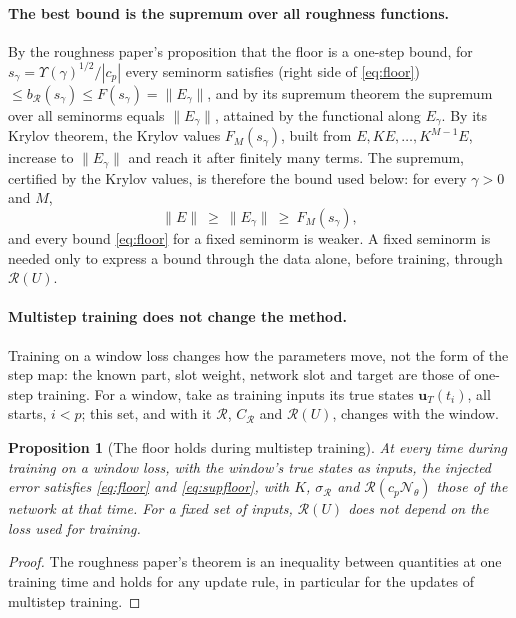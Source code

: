 \documentclass[11pt]{article}
\newtheorem{proposition}{Proposition}
\theoremstyle{definition}
\theoremstyle{remark}
\newcommand{\uu}{\mathbf{u}}
\newcommand{\Rgh}{\mathcal{R}}
\newcommand{\Nn}{\mathcal N_\theta}
\begin{document}
\paragraph{The best bound is the supremum over all roughness functions.}
By the roughness paper's proposition that the floor is a one-step bound, for $s_\gamma=\Upsilon(\gamma)^{1/2}/|c_p|$ every seminorm satisfies (right side of \eqref{eq:floor}) $\le b_\Rgh(s_\gamma)\le F(s_\gamma)=\|E_\gamma\|$, and by its supremum theorem the supremum over all seminorms equals $\|E_\gamma\|$, attained by the functional along $E_\gamma$.
By its Krylov theorem, the Krylov values $F_M(s_\gamma)$, built from $E,KE,\dots,K^{M-1}E$, increase to $\|E_\gamma\|$ and reach it after finitely many terms.
The supremum, certified by the Krylov values, is therefore the bound used below: for every $\gamma>0$ and $M$,
\begin{equation}\label{eq:supfloor}
\|E\|\ \ge\ \|E_\gamma\|\ \ge\ F_M(s_\gamma),
\end{equation}
and every bound \eqref{eq:floor} for a fixed seminorm is weaker. A fixed seminorm is needed only to express a bound through the data alone, before training, through $\Rgh(U)$.

\paragraph{Multistep training does not change the method.}
Training on a window loss changes how the parameters move, not the form of the step map: the known part, slot weight, network slot and target are those of one-step training.
For a window, take as training inputs its true states $\uu_T(t_i)$, all starts, $i<p$; this set, and with it $\Rgh$, $C_\Rgh$ and $\Rgh(U)$, changes with the window.

\begin{proposition}[The floor holds during multistep training]\label{prop:floorms}
At every time during training on a window loss, with the window's true states as inputs, the injected error satisfies \eqref{eq:floor} and \eqref{eq:supfloor}, with $K$, $\sigma_\Rgh$ and $\Rgh(c_p\Nn)$ those of the network at that time.
For a fixed set of inputs, $\Rgh(U)$ does not depend on the loss used for training.
\end{proposition}

\begin{proof}
The roughness paper's theorem is an inequality between quantities at one training time and holds for any update rule, in particular for the updates of multistep training.
\end{proof}
\end{document}
